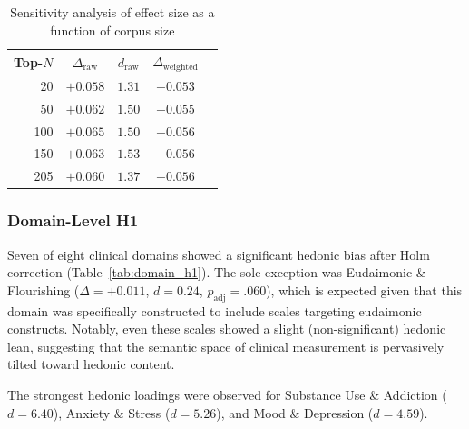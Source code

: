 \documentclass[12pt,a4paper]{article}
\begin{document}
\begin{table}[H]
\centering
\caption{Sensitivity analysis of effect size as a function of corpus size}
\label{tab:sensitivity}
\small
\begin{tabular}{rcccc}
\toprule
\textbf{Top-$N$} & \textbf{$\Delta_{\text{raw}}$} & \textbf{$d_{\text{raw}}$} & \textbf{$\Delta_{\text{weighted}}$} \\
\midrule
20  & $+0.058$ & $1.31$ & $+0.053$ \\
50  & $+0.062$ & $1.50$ & $+0.055$ \\
100 & $+0.065$ & $1.50$ & $+0.056$ \\
150 & $+0.063$ & $1.53$ & $+0.056$ \\
205 & $+0.060$ & $1.37$ & $+0.056$ \\
\bottomrule
\end{tabular}
\end{table}

\subsubsection{Domain-Level H1}

Seven of eight clinical domains showed a significant hedonic bias after Holm correction (Table~\ref{tab:domain_h1}).
The sole exception was Eudaimonic \& Flourishing ($\Delta = +0.011$, $d = 0.24$, $p_{\text{adj}} = .060$), which is expected given that this domain was specifically constructed to include scales targeting eudaimonic constructs.
Notably, even these scales showed a slight (non-significant) hedonic lean, suggesting that the semantic space of clinical measurement is pervasively tilted toward hedonic content.

The strongest hedonic loadings were observed for Substance Use \& Addiction ($d = 6.40$), Anxiety \& Stress ($d = 5.26$), and Mood \& Depression ($d = 4.59$).
\end{document}
